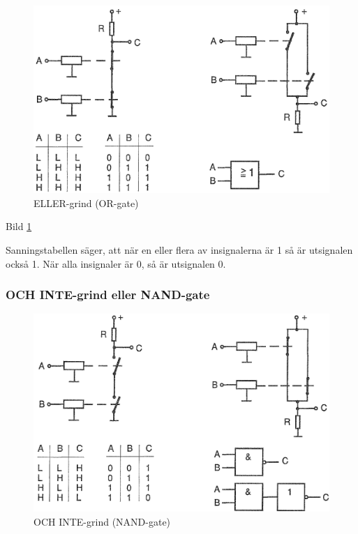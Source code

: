 \begin{figure}
\includegraphics[width=\textwidth]{images/bild_2_2-38.png}
\caption{ELLER-grind (OR-gate)}
\label{fig:BildII2-38}
\end{figure}

Bild \ref{fig:BildII2-38}

Sanningstabellen säger, att när en eller flera av insignalerna är 1 så är
utsignalen också 1. När alla insignaler är 0, så är utsignalen 0.

\subsubsection{OCH INTE-grind eller NAND-gate}

\begin{figure}
\includegraphics[width=\textwidth]{images/bild_2_2-39.png}
\caption{OCH INTE-grind (NAND-gate)}
\label{fig:BildII2-39}
\end{figure}

